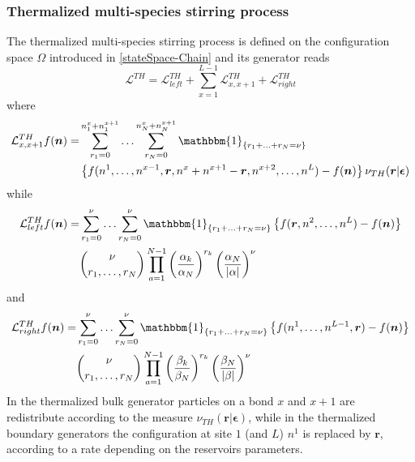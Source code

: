 \documentclass[10pt]{article}
\numberwithin{equation}{section}
\numberwithin{equation}{subsection}
\begin{document}
\subsubsection{Thermalized multi-species stirring process}
The thermalized multi-species stirring process is defined on the configuration space $\Omega$ introduced in \eqref{stateSpace-Chain} and its generator reads
\begin{equation}\label{thermalizedGenerator}
	\mathcal{L}^{TH}=\mathcal{L}_{left}^{TH}+\sum_{x=1}^{L-1}\mathcal{L}_{x,x+1}^{TH}+\mathcal{L}_{right}^{TH}
\end{equation}
where 
\begin{equation}\label{bulkThermalized}
	\begin{split}
	\mathcal{L}_{x,x+1}^{TH}f(\bm{n})=&\sum_{r_{1}=0}^{n_{1}^{x}+n_{1}^{x+1}}\ldots\sum_{r_{N}=0}^{n_{N}^{x}+n_{N}^{x+1}}\mathbbm{1}_{\{r_{1}+\ldots+r_{N}=\nu\}}
	\\&
	\left\{f(n^{1},\ldots,n^{x-1},\bm{r},n^{x}+n^{x+1}-\bm{r},n^{x+2},\ldots,n^{L})-f(\bm{n})\right\}\nu_{TH}(\bm{r}|\bm{\epsilon})
	\end{split}
\end{equation}
while
\begin{equation}\label{boundaryThermalized}
	\begin{split}
		\mathcal{L}_{left}^{TH}f(\bm{n})=&\sum_{r_{1}=0}^{\nu}\ldots\sum_{r_{N}=0}^{\nu}\mathbbm{1}_{\{r_{1}+\ldots+r_{N}=\nu\}}\left\{f(\bm{r},n^{2},\ldots,n^{L})-f(\bm{n})\right\}\\&
		\binom{\nu}{r_{1},\ldots, r_{N}}\prod_{a=1}^{N-1}\left(\frac{\alpha_{k}}{\alpha_{N}}\right)^{r_{k}}\left(\frac{\alpha_{N}}{|\alpha|}\right)^{\nu}
		\end{split}
	\end{equation}
and 
\begin{equation}
	\begin{split}
		\mathcal{L}_{right}^{TH}f(\bm{n})=&\sum_{r_{1}=0}^{\nu}\ldots\sum_{r_{N}=0}^{\nu}\mathbbm{1}_{\{r_{1}+\ldots+r_{N}=\nu\}}\left\{f(n^{1},\ldots,n^{L-1},\bm{r})-f(\bm{n})\right\}\\&
		\binom{\nu}{r_{1},\ldots, r_{N}}\prod_{a=1}^{N-1}\left(\frac{\beta_{k}}{\beta_{N}}\right)^{r_{k}}\left(\frac{\beta_{N}}{|\beta|}\right)^{\nu}
	\end{split}
\end{equation}
In the thermalized bulk generator particles on a bond $x$ and $x+1$ are redistribute according to the measure $\nu_{TH}(\bm{r}|\bm{\epsilon})$, while in the thermalized boundary generators the configuration at site $1$ (and $L$) $n^{1}$ is replaced by $\bm{r}$, according to a rate depending on the reservoirs parameters. 
\end{document}
